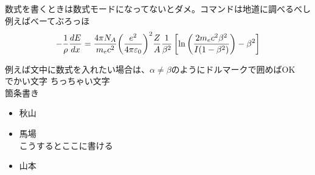 \documentclass[a4paper,11pt,dvipdfmx]{jsarticle}
\begin{document}
\newpage
\noindent %
数式を書くときは数式モードになってないとダメ。コマンドは地道に調べるべし\\
例えばべーてぶろっほ
\begin{equation}
\centering
\large
 -\frac{1}{\rho}\frac{dE}{dx} = \frac{4\pi{N_A}}{{m_e}c^2}{\left( \frac{e^2}{4\pi\varepsilon_0}\right)}^2\frac{Z}{A}\frac{1}{\beta^2}\left[\ln{\left(\frac{2m_ec^2\beta^2}{I(1-\beta^2)} \right)-\beta^2}\right]
  \label{BB}
\end{equation}

例えば文中に数式を入れたい場合は、$\alpha\neq\beta$のようにドルマークで囲めばOK\\


\LARGE{でかい文字}
\small{ちっちゃい文字} \\

箇条書き
\begin{itemize}
  \item 秋山
  \item 馬場\mbox{}\\
  こうするとここに書ける
  \item 山本
\end{itemize}
\end{document}

